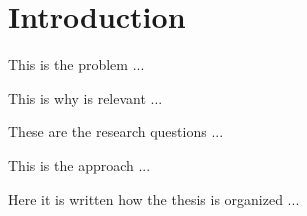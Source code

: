 \chapter{Introduction}
\label{cha:intro}
\vspace{0.4 cm}

This is the problem ...

This is why is relevant ...

These are the research questions ...

This is the approach ...

Here it is written how the thesis is organized ...
